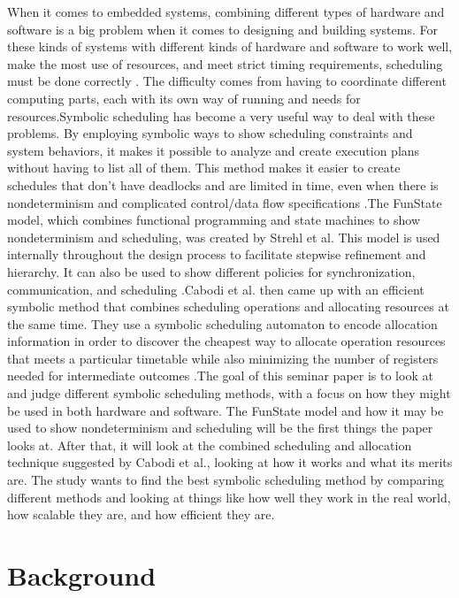 \documentclass[conference]{IEEEtran}
\begin{document}
When it comes to embedded systems, combining different types of hardware and software is a big problem when it comes to designing and building systems.  For these kinds of systems with different kinds of hardware and software to work well, make the most use of resources, and meet strict timing requirements, scheduling must be done correctly \cite{strehl1999scheduling}.  The difficulty comes from having to coordinate different computing parts, each with its own way of running and needs for resources.Symbolic scheduling has become a very useful way to deal with these problems.  By employing symbolic ways to show scheduling constraints and system behaviors, it makes it possible to analyze and create execution plans without having to list all of them.  This method makes it easier to create schedules that don't have deadlocks and are limited in time, even when there is nondeterminism and complicated control/data flow specifications \cite{strehl1999scheduling}.The FunState model, which combines functional programming and state machines to show nondeterminism and scheduling, was created by Strehl et al.  This model is used internally throughout the design process to facilitate stepwise refinement and hierarchy. It can also be used to show different policies for synchronization, communication, and scheduling \cite{strehl1999scheduling}.Cabodi et al. then came up with an efficient symbolic method that combines scheduling operations and allocating resources at the same time.  They use a symbolic scheduling automaton to encode allocation information in order to discover the cheapest way to allocate operation resources that meets a particular timetable while also minimizing the number of registers needed for intermediate outcomes \cite{cabodi2002symbolic}.The goal of this seminar paper is to look at and judge different symbolic scheduling methods, with a focus on how they might be used in both hardware and software.  The FunState model and how it may be used to show nondeterminism and scheduling will be the first things the paper looks at.  After that, it will look at the combined scheduling and allocation technique suggested by Cabodi et al., looking at how it works and what its merits are.  The study wants to find the best symbolic scheduling method by comparing different methods and looking at things like how well they work in the real world, how scalable they are, and how efficient they are.

\section{\textbf{Background}}
\end{document}
